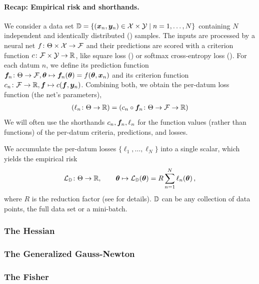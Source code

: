 \paragraph{Recap: Empirical risk and shorthands.}
We consider a data set ${\mathbb{D}} = \{({\bm{x}}_n, {\bm{y}}_n) \in {\mathcal{X}} \times {\mathcal{Y}} \mid n = 1, \dots, N \}$ containing $N$ independent and identically distributed (\iid) samples.
The inputs are processed by a neural net $f\colon \Theta \times {\mathcal{X}} \to {\mathcal{F}}$ and their predictions are scored with a criterion function $c\colon {\mathcal{F}} \times {\mathcal{Y}} \to {\mathbb{R}}$, like square loss () or softmax cross-entropy loss ().
For each datum $n$, we define its prediction function ${\bm{f}}_n\colon \Theta \to {\mathcal{F}}, {\bm{\theta}} \mapsto {\bm{f}}_n({\bm{\theta}}) = f({\bm{\theta}}, {\bm{x}}_n)$ and its criterion function $c_n\colon {\mathcal{F}} \to {\mathbb{R}}, {\bm{f}} \mapsto c({\bm{f}}, {\bm{y}}_n)$.
Combining both, we obtain the per-datum loss function (\wrt the net's parameters),
\begin{align*}
  (\ell_n\colon \Theta \to {\mathbb{R}}) = (c_n \circ {\bm{f}}_n\colon \Theta \to {\mathcal{F}} \to {\mathbb{R}})
\end{align*}
We will often use the shorthands $c_n, {\bm{f}}_n, \ell_n$ for the function values (rather than functions) of the per-datum criteria, predictions, and losses.

We accumulate the per-datum losses $\{\ell_1, \dots, \ell_N\}$ into a single scalar, which yields the empirical risk
\begin{align*}
  {\mathcal{L}}_{{\mathbb{D}}}\colon \Theta \to {\mathbb{R}},
  \qquad
  {\bm{\theta}} \mapsto {\mathcal{L}}_{{\mathbb{D}}}({\bm{\theta}}) = R \sum_{n=1}^N \ell_n({\bm{\theta}})\,,
\end{align*}
where $R$ is the reduction factor (see  for details).
${\mathbb{D}}$ can be any collection of data points, \eg the full data set or a mini-batch.

\subsubsection{The Hessian}\label{sec:basics_dl_hessian}


\subsubsection{The Generalized Gauss-Newton}


\subsubsection{The Fisher}\label{sec:fisher}


